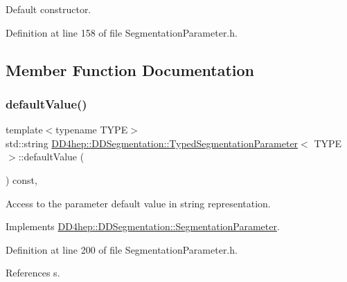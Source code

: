 Default constructor. 



Definition at line 158 of file Segmentation\+Parameter.\+h.



\subsection{Member Function Documentation}
\hypertarget{class_d_d4hep_1_1_d_d_segmentation_1_1_typed_segmentation_parameter_a56ed62bf9808b631e25a76e79ff8a686}{}\label{class_d_d4hep_1_1_d_d_segmentation_1_1_typed_segmentation_parameter_a56ed62bf9808b631e25a76e79ff8a686} 
\subsubsection{\texorpdfstring{default\+Value()}{defaultValue()}}
{\footnotesize\ttfamily template$<$typename T\+Y\+PE$>$ \\
std\+::string \hyperlink{class_d_d4hep_1_1_d_d_segmentation_1_1_typed_segmentation_parameter}{D\+D4hep\+::\+D\+D\+Segmentation\+::\+Typed\+Segmentation\+Parameter}$<$ T\+Y\+PE $>$\+::default\+Value (\begin{DoxyParamCaption}{ }\end{DoxyParamCaption}) const\hspace{0.3cm}{\ttfamily [inline]}, {\ttfamily [virtual]}}



Access to the parameter default value in string representation. 



Implements \hyperlink{class_d_d4hep_1_1_d_d_segmentation_1_1_segmentation_parameter_a2ef4dee84f8c9172aca49908c8fff136}{D\+D4hep\+::\+D\+D\+Segmentation\+::\+Segmentation\+Parameter}.



Definition at line 200 of file Segmentation\+Parameter.\+h.



References s.

\hypertarget{class_d_d4hep_1_1_d_d_segmentation_1_1_typed_segmentation_parameter_a53509da19e4377e01d2fdb685f94778a}{}\label{class_d_d4hep_1_1_d_d_segmentation_1_1_typed_segmentation_parameter_a53509da19e4377e01d2fdb685f94778a} 
